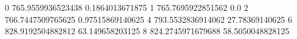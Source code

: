 0 765.9559936523438 0.1864013671875
1 765.7695922851562 0.0
2 766.7447509765625 0.97515869140625
4 793.5532836914062 27.78369140625
6 828.9192504882812 63.149658203125
8 824.2745971679688 58.5050048828125
